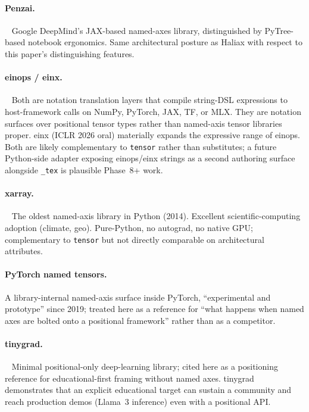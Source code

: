 \documentclass[11pt,a4paper]{article}
\begin{document}
\paragraph{Penzai.}~\cite{Penzai2024} Google DeepMind's JAX-based
named-axes library, distinguished by PyTree-based notebook
ergonomics. Same architectural posture as Haliax with respect to
this paper's distinguishing features.

\paragraph{einops / einx.}~\cite{einops2022,einx2026} Both are
notation translation layers that compile string-DSL expressions
to host-framework calls on NumPy, PyTorch, JAX, TF, or MLX. They
are notation surfaces over positional tensor types rather than
named-axis tensor libraries proper. einx (ICLR 2026 oral)
materially expands the expressive range of einops. Both are
likely complementary to \texttt{tensor} rather than
substitutes; a future Python-side adapter exposing einops/einx
strings as a second authoring surface alongside \texttt{\_tex}
is plausible Phase~8+ work.

\paragraph{xarray.}~\cite{xarray2017} The oldest named-axis
library in Python (2014). Excellent
scientific-computing adoption (climate, geo).
Pure-Python, no autograd, no native GPU; complementary
to \texttt{tensor} but not directly comparable on architectural
attributes.

\paragraph{PyTorch named tensors.} A library-internal
named-axis surface inside PyTorch, ``experimental and prototype''
since 2019; treated here as a reference for ``what happens
when named axes are bolted onto a positional framework'' rather
than as a competitor.

\paragraph{tinygrad.}~\cite{tinygrad2024} Minimal positional-only
deep-learning library; cited here as a positioning reference for
educational-first framing without named axes. tinygrad
demonstrates that an explicit educational target can sustain a
community and reach production demos
(Llama~3 inference) even with a positional API.
\end{document}
